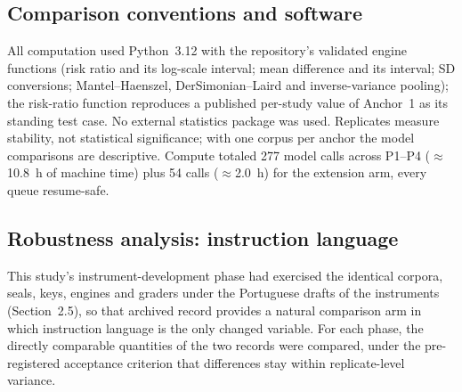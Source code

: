 \documentclass[11pt]{article}
\begin{document}
\subsection{Comparison conventions and software}
All computation used Python~3.12 with the repository's validated engine functions (risk ratio and its log-scale interval; mean difference and its interval; SD conversions; Mantel--Haenszel, DerSimonian--Laird and inverse-variance pooling); the risk-ratio function reproduces a published per-study value of Anchor~1 as its standing test case. No external statistics package was used. Replicates measure stability, not statistical significance; with one corpus per anchor the model comparisons are descriptive. Compute totaled 277 model calls across P1--P4 ($\approx$10.8~h of machine time) plus 54 calls ($\approx$2.0~h) for the extension arm, every queue resume-safe.

\subsection{Robustness analysis: instruction language}\label{sec:lang}
This study's instrument-development phase had exercised the identical corpora, seals, keys, engines and graders under the Portuguese drafts of the instruments (Section~2.5), so that archived record provides a natural comparison arm in which instruction language is the only changed variable. For each phase, the directly comparable quantities of the two records were compared, under the pre-registered acceptance criterion that differences stay within replicate-level variance.
\end{document}

